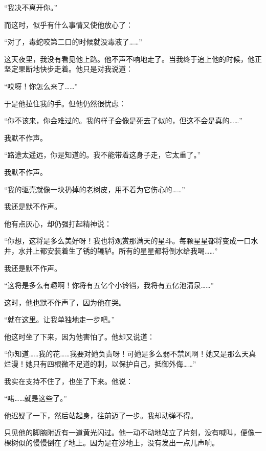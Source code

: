 “我决不离开你。”

而这时，似乎有什么事情又使他放心了：

“对了，毒蛇咬第二口的时候就没毒液了\ldots{}\ldots{}”

这天夜里，我没有看见他上路。他不声不响地走了。当我终于追上他的时候，他正坚定果断地快步走着。他只是对我说道：

“哎呀！你怎么来了\ldots{}\ldots{}”

于是他拉住我的手。但他仍然很忧虑：

“你不该来，你会难过的。我的样子会像是死去了似的，但这不会是真的\ldots{}\ldots{}”

我默不作声。

“路途太遥远，你是知道的。我不能带着这身子走，它太重了。”

{\startalignment[center]
 \stopalignment}

我默不作声。

“我的驱壳就像一块扔掉的老树皮，用不着为它伤心的\ldots{}\ldots{}”

我还是默不作声。

他有点灰心，却仍强打起精神说：

“你想，这将是多么美好呀！我也将观赏那满天的星斗。每颗星星都将变成一口水井，水井上都安装着生了锈的辘轳。所有的星星都将倒水给我喝\ldots{}\ldots{}”

我还是默不作声。

“这将是多么有趣啊！你将有五亿个小铃铛，我将有五亿池清泉\ldots{}\ldots{}”

这时，他也默不作声了，因为他在哭。

“就在这里。让我单独地走一步吧。”

他这时坐了下来，因为他害怕了。他却又说道：

{\startalignment[center]
 \stopalignment}

“你知道\ldots{}\ldots{}我的花\ldots{}\ldots{}我要对她负责呀！可她是多么弱不禁风啊！她又是那么天真烂漫！她只有四根微不足道的刺，以保护自己，抵御外侮\ldots{}\ldots{}”

我实在支持不住了，也坐了下来。他说：

“喏\ldots{}\ldots{}就是这些了。”

他迟疑了一下，然后站起身，往前迈了一步。我却动弹不得。

只见他的脚腕附近有一道黄光闪过。他一动不动地站立了片刻，没有喊叫，便像一棵树似的慢慢倒在了地上。因为是在沙地上，没有发出一点儿声响。

